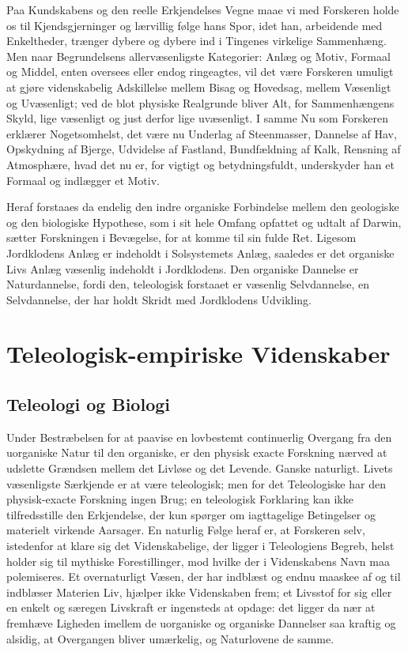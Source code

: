 \documentclass[12pt]{book}
\newcommand{\apage}[1]{\marginnote{\footnotesize\textit{[#1]}}}
\begin{document}
Paa Kundskabens og den reelle Erkjendelses Vegne maae vi med Forskeren
holde os til Kjendsgjerninger og lærvillig følge hans Spor, idet han,
arbeidende med Enkeltheder, trænger dybere og dybere ind i Tingenes
virkelige Sammenhæng. Men naar Begrundelsens allervæsenligste Kategorier:
Anlæg og Motiv, Formaal og Middel, enten oversees eller endog ringeagtes,
vil det være Forskeren umuligt at gjøre videnskabelig Adskillelse mellem
Bisag og Hovedsag, mellem Væsenligt og Uvæsenligt; ved de blot physiske
Realgrunde bliver Alt, for Sammenhængens Skyld, lige væsenligt og just
derfor lige uvæsenligt. I samme Nu som Forskeren erklærer Nogetsomhelst,
det være nu Underlag af Steenmasser, Dannelse af Hav, Opskydning af Bjerge,
Udvidelse af Fastland, Bundfældning af Kalk, Rensning af Atmosphære, hvad
det nu er, for vigtigt og betydningsfuldt, underskyder han et Formaal og
indlægger et Motiv.

Heraf forstaaes da endelig den indre organiske Forbindelse mellem den
geologiske og den biologiske Hypothese, som i sit hele Omfang opfattet og
udtalt af Darwin, sætter Forskningen i Bevægelse, for at komme til sin
fulde Ret. Ligesom Jordklodens Anlæg er indeholdt i Solsystemets Anlæg,
saaledes er det organiske Livs Anlæg væsenlig indeholdt i Jordklodens. \apage{172} Den
organiske Dannelse er Naturdannelse, fordi den, teleologisk forstaaet er
væsenlig Selvdannelse, en Selvdannelse, der har holdt Skridt med
Jordklodens Udvikling.


\chapter{Teleologisk-empiriske Videnskaber}

\section{Teleologi og Biologi}
\label{sec:17}

\noindent Under Bestræbelsen for at paavise en lovbestemt continuerlig
Overgang fra den uorganiske Natur til den organiske, er den physisk exacte
Forskning nærved at udslette Grændsen mellem det Livløse og det Levende.
Ganske naturligt. Livets væsenligste Særkjende er at være teleologisk; men
for det Teleologiske har den physisk-exacte Forskning ingen Brug; en
teleologisk Forklaring kan ikke tilfredsstille den Erkjendelse, der kun
spørger om iagttagelige Betingelser og materielt virkende Aarsager. En
naturlig Følge heraf er, at Forskeren selv, istedenfor at klare sig det
Videnskabelige, der ligger i Teleologiens Begreb, helst holder sig til
mythiske Forestillinger, mod hvilke der i Videnskabens Navn maa
polemiseres. Et overnaturligt Væsen, der har indblæst og endnu maaskee af
og til indblæser Materien Liv, hjælper ikke Videnskaben frem; et Livsstof
for sig eller en enkelt og særegen Livskraft er ingensteds at opdage: det
ligger da nær at fremhæve \apage{173} Ligheden imellem de uorganiske og organiske
Dannelser saa kraftig og alsidig, at Overgangen bliver umærkelig, og
Naturlovene de samme.
\end{document}
